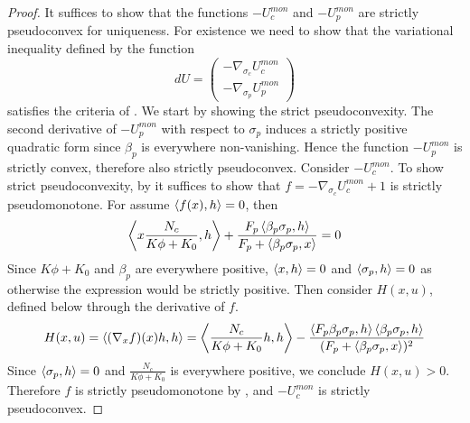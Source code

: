 \begin{proof}
  It suffices to show that the functions $-U_c^{mon}$ and $-U_p^{mon}$ are strictly pseudoconvex for uniqueness. For existence we need to show that the variational inequality defined by the function
  \begin{equation}
    \label{eq:var_ineq}
    dU = \begin{pmatrix}-\nabla_{\sigma_c} U_c^{mon} \\ -\nabla_{\sigma_p} U_p^{mon}\end{pmatrix}
  \end{equation} satisfies the criteria of .
  We start by showing the strict pseudoconvexity. The second derivative of $-U_p^{mon}$ with respect to $\sigma_p$ induces a strictly positive quadratic form since $\beta_p$ is everywhere non-vanishing. Hence the function $-U_p^{mon}$ is strictly convex, therefore also strictly pseudoconvex. Consider $-U_c^{mon}$. To show strict pseudoconvexity, by  it suffices to show that $f = -\nabla_{\sigma_c} U_c^{mon} + 1$ is strictly pseudomonotone. For  assume $\left \langle f(x),h \right \rangle = 0$, then
  \begin{equation}
    \ip{x \frac{N_c}{K\phi + K_0} }{h} + \frac{F_p \ip{\beta_p \sigma_p}{h}}{F_p + \ip{\beta_p \sigma_p}{x}} = 0
  \end{equation}
  Since $K\phi + K_0$ and $\beta_p$ are everywhere positive, $\left \langle x,h \right \rangle = 0$ and $\left \langle \sigma_p,h \right \rangle = 0$ as otherwise the expression would be strictly positive. Then consider $H(x,u)$, defined below through the derivative of $f$.
  \begin{equation}
    H(x,u)=\ip{(\nabla_x f)(x)h}{h} = \ip{\frac{N_c}{K\phi + K_0}  h}{h} - \frac{\ip{F_p \beta_p \sigma_p}{h}\ip{\beta_p \sigma_p}{h}}{(F_p + \ip{\beta_p \sigma_p}{x})^2}
  \end{equation}
  Since $\left \langle \sigma_p,h \right \rangle=0$ and $\frac{N_c}{K\phi + K_0}$ is everywhere positive, we conclude $H(x,u)>0$. Therefore $f$ is strictly pseudomonotone by , and $-U_c^{mon}$ is strictly pseudoconvex.


\end{proof}
